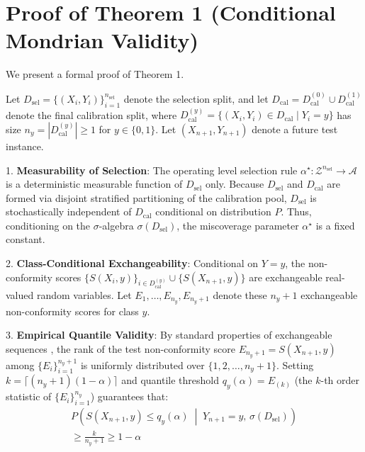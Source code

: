 \documentclass{ieeetj}
\begin{document}
\section{Proof of Theorem 1 (Conditional Mondrian Validity)}
\label{sec:appendix_proof}

We present a formal proof of Theorem 1.

\begin{IEEEproof}
Let $D_{\mathrm{sel}} = \{(X_i, Y_i)\}_{i=1}^{n_{\mathrm{sel}}}$ denote the selection split, and let $D_{\mathrm{cal}} = D_{\mathrm{cal}}^{(0)} \cup D_{\mathrm{cal}}^{(1)}$ denote the final calibration split, where $D_{\mathrm{cal}}^{(y)} = \{(X_i, Y_i) \in D_{\mathrm{cal}} \mid Y_i = y\}$ has size $n_y = |D_{\mathrm{cal}}^{(y)}| \ge 1$ for $y \in \{0, 1\}$. Let $(X_{n+1}, Y_{n+1})$ denote a future test instance.

1. \textbf{Measurability of Selection}: The operating level selection rule $\alpha^\star: \mathcal{Z}^{n_{\mathrm{sel}}} \to \mathcal{A}$ is a deterministic measurable function of $D_{\mathrm{sel}}$ only. Because $D_{\mathrm{sel}}$ and $D_{\mathrm{cal}}$ are formed via disjoint stratified partitioning of the calibration pool, $D_{\mathrm{sel}}$ is stochastically independent of $D_{\mathrm{cal}}$ conditional on distribution $P$. Thus, conditioning on the $\sigma$-algebra $\sigma(D_{\mathrm{sel}})$, the miscoverage parameter $\alpha^\star$ is a fixed constant.

2. \textbf{Class-Conditional Exchangeability}: Conditional on $Y=y$, the non-conformity scores $\{S(X_i, y)\}_{i \in D_{\mathrm{cal}}^{(y)}} \cup \{S(X_{n+1}, y)\}$ are exchangeable real-valued random variables. Let $E_1, \dots, E_{n_y}, E_{n_y+1}$ denote these $n_y+1$ exchangeable non-conformity scores for class $y$.

3. \textbf{Empirical Quantile Validity}: By standard properties of exchangeable sequences \cite{vovk2005algorithmic, sadinle2019least}, the rank of the test non-conformity score $E_{n_y+1} = S(X_{n+1}, y)$ among $\{E_i\}_{i=1}^{n_y+1}$ is uniformly distributed over $\{1, 2, \dots, n_y+1\}$. Setting $k = \lceil (n_y+1)(1-\alpha) \rceil$ and quantile threshold $q_y(\alpha) = E_{(k)}$ (the $k$-th order statistic of $\{E_i\}_{i=1}^{n_y}$) guarantees that:
\begin{equation}
\begin{split}
P\!\left(S(X_{n+1}, y) \le q_y(\alpha) \;\middle|\; Y_{n+1}=y, \, \sigma(D_{\mathrm{sel}})\right) \\
\ge \tfrac{k}{n_y+1} \ge 1 - \alpha
\end{split}
\end{equation}


\end{IEEEproof}
\end{document}
